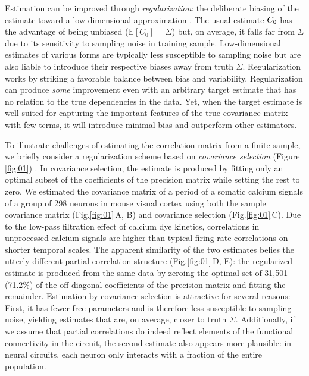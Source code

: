 \documentclass[10pt]{article}
\newcommand{\E}[2][]{\mathbb E_{#1}\left[ #2\right]}    %
\begin{document}
Estimation can be improved through \emph{regularization}: the deliberate biasing of the estimate toward a low-dimensional approximation \cite{Schafer:2005,Bickel:2006}.  The usual estimate $C_{\sf 0}$ has the advantage of being unbiased ($\E{C_0}=\Sigma$) but, on average, it falls far from $\Sigma$ due to its sensitivity to sampling noise in training sample.  Low-dimensional estimates of various forms are typically less susceptible to sampling noise but are also liable to introduce their respective biases away from truth $\Sigma$.  Regularization works by striking a favorable balance between bias and variability. Regularization can produce \emph{some} improvement even with an arbitrary target estimate that has no relation to the true dependencies in the data.  Yet, when the target estimate is well suited for capturing the important features of the true covariance matrix with few terms, it will introduce minimal bias and outperform other estimators. 

To illustrate challenges of estimating the correlation matrix from a finite sample, we briefly consider a regularization scheme based on \emph{covariance selection} (Figure \ref{fig:01}) \cite{Dempster:1972}. In covariance selection, the estimate is produced by fitting only an optimal subset of the coefficients of the precision matrix while setting the rest to zero. We estimated the covariance matrix of a period of a somatic calcium signals of a group of 298 neurons in mouse visual cortex using both the sample covariance matrix (Fig.\;\ref{fig:01}\,A, B) and covariance selection (Fig.\;\ref{fig:01}\,C). Due to the low-pass filtration effect of calcium dye kinetics, correlations in unprocessed calcium signals are higher than typical firing rate correlations on shorter temporal scales. The apparent similarity of the two estimates belies the utterly different partial correlation structure (Fig.\;\ref{fig:01}\,D, E): the regularized estimate is produced from the same data by zeroing the optimal set of 31,501 (71.2\%) of the off-diagonal coefficients of the precision matrix and fitting the remainder. Estimation by covariance selection is attractive for several reasons: First, it has fewer free parameters and is therefore less susceptible to sampling noise, yielding estimates that are, on average, closer to truth $\Sigma$. Additionally, if we assume that partial correlations do indeed reflect elements of the functional connectivity in the circuit, the second estimate also appears more plausible: in neural circuits, each neuron only interacts with a fraction of the entire population.
\end{document}
